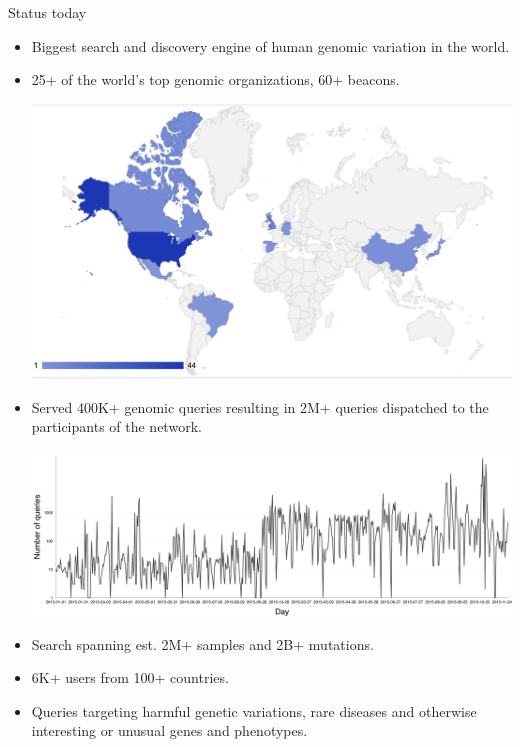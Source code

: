 \documentclass{beamer}
\begin{document}
\begin{frame}[fragile]
\begin{columns}[T]
\begin{column}{.35\textwidth}
\begin{block}{Status today\hfill{}}
\begin{itemize}
\item Biggest search and discovery engine of human genomic variation in the world.
\item 25+ of the world's top genomic organizations, 60+ beacons.
\begin{center}
\includegraphics[width=\linewidth]{img/map.png}
\end{center}
\item Served 400K+ genomic queries resulting in 2M+ queries dispatched to the participants of the network.
\begin{center}
\includegraphics[width=\linewidth]{img/queries.png}
\end{center}
\item Search spanning est. 2M+ samples and 2B+ mutations.
\item 6K+ users from 100+ countries.
\item Queries targeting harmful genetic variations, rare diseases and otherwise interesting or unusual genes and phenotypes.

\end{itemize}
\end{block}
\end{column}
\end{columns}
\end{frame}
\end{document}
